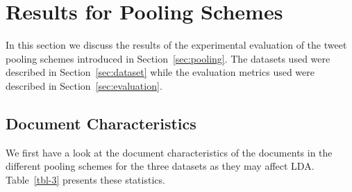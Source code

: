 \documentclass{sig-alternate}
\begin{document}
%


\section{Results for Pooling Schemes}

In this section we discuss the results of the experimental evaluation
of the tweet pooling schemes introduced in
Section~\ref{sec:pooling}. The datasets used were described in
Section~\ref{sec:dataset} while the evaluation metrics used were
described in Section~\ref{sec:evaluation}.

\label{sec:init_results}

\subsection{Document Characteristics}

We first have a look at the document characteristics of the documents
in the different pooling schemes for the three datasets as they may
affect LDA.  Table~\ref{tbl-3} presents these statistics.
\end{document}
